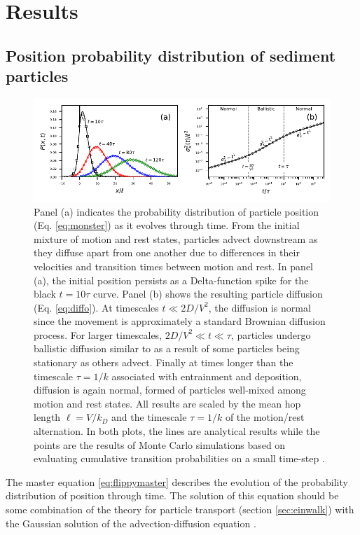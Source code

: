 \section{Results \label{sec:res}}
\subsection{Position probability distribution of sediment particles}
\begin{figure}
	\centerline{\includegraphics{figures/ch2/figure2_slopeKey.pdf}}
	\caption{Panel (a) indicates the probability distribution of particle position (Eq. \ref{eq:monster}) as it evolves through time. From the initial mixture of motion and rest states, particles advect downstream as they diffuse apart from one another due to differences in their velocities and transition times between motion and rest. In panel (a), the initial position persists as a Delta-function spike for the black $t=10\tau$ curve. Panel (b) shows the resulting particle diffusion (Eq. \ref{eq:diffo}). At timescales $t \ll 2D/V^2$, the diffusion is normal since the movement is approximately a standard Brownian diffusion process. For larger timescales, $2D/V^2 \ll t \ll \tau$, particles undergo ballistic diffusion similar to \citet{Lisle1998} as a result of some particles being stationary as others advect. Finally at times longer than the timescale $\tau = 1/k$ associated with entrainment and deposition, diffusion is again normal, formed of particles well-mixed among motion and rest states. All results are scaled by the mean hop length $\ell=V/k_D$ and the timescale $\tau=1/k$ of the motion/rest alternation. In both plots, the lines are analytical results while the points are the results of Monte Carlo simulations based on evaluating cumulative transition probabilities on a small time-step \citep[e.g.][]{Barik2006}.}
	\label{fig:flippyfig1}
\end{figure}
The master equation \ref{eq:flippymaster} describes the evolution of the probability distribution of position through time. The solution of this equation should be some combination of the \citet{Einstein1937} theory for particle transport (section \ref{sec:einwalk}) with the Gaussian solution of the advection-diffusion equation \citep[e.g.][]{Morse1953}.

